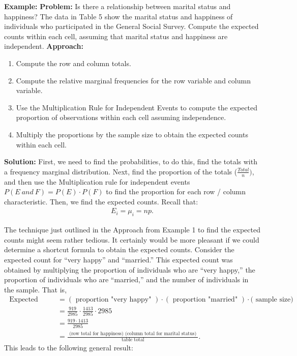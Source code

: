 \documentclass{report}
\begin{document}
    \pagebreak \bigbreak \noindent 
    \begin{mdframed}
      \textbf{Example: }
      \bigbreak \noindent 
      \textbf{Problem:}
      Is there a relationship between marital status and happiness? The data in Table 5 show the marital status and happiness of individuals who participated in the General Social Survey. Compute the expected counts within each cell, assuming that marital status and happiness are independent.
      \bigbreak \noindent 
      \textbf{Approach:}
      \begin{enumerate}
          \item  Compute the row and column totals.
            \item  Compute the relative marginal frequencies for the row variable and column variable.
            \item  Use the Multiplication Rule for Independent Events to compute the expected proportion of observations within each cell assuming independence.
            \item  Multiply the proportions by the sample size to obtain the expected counts within each cell.
      \end{enumerate}
      \bigbreak \noindent 
      \textbf{Solution:}
      \bigbreak \noindent 
      First, we need to find the probabilities, to do this, find the totals with a frequency marginal distribution. Next, find the proportion of the totals ($\frac{Total}{n})$, and then 
      use the Multiplication rule for independent events $P(E\ and\ F) =  P(E) \cdot P(F)$ to find the proportion for each row / column characteristic. 
      \bigbreak \noindent 
      Then, we find the expected counts. Recall that:
      \begin{align*}
         E_{i} =\mu_{i}= np 
      .\end{align*}
      \end{mdframed}
      \bigbreak \noindent 
      The technique just outlined in the Approach from Example 1 to find the expected counts might seem rather tedious. It certainly would be more pleasant if we could determine a shortcut formula to obtain the expected counts. Consider the expected count for “very happy” and “married.” This expected count was obtained by multiplying the proportion of individuals who are “very happy,” the proportion of individuals who are “married,” and the number of individuals in the sample. That is,
      \bigbreak \noindent 
      \begin{align*}
            \text { Expected count } & =(\text { proportion "very happy" }) \cdot(\text { proportion "married" }) \cdot(\text { sample size) } \\
            & =\frac{919}{2985} \cdot \frac{1413}{2985} \cdot 2985 \\
            & =\frac{919 \cdot 1413}{2985} \\
            & =\frac{\text { (row total for happiness) (column total for marital status) }}{\text { table total }}
        .\end{align*}
        \bigbreak \noindent 
        This leads to the following general result:
\end{document}
